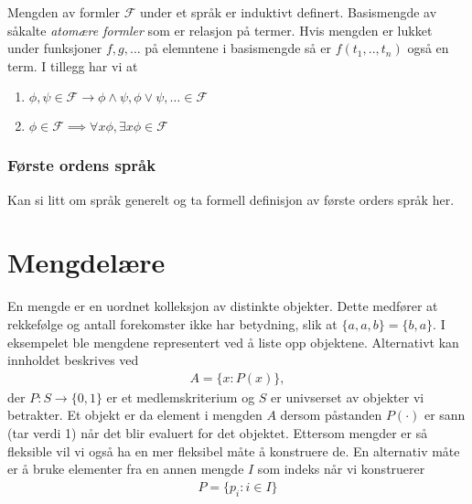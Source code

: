 Mengden av formler $\mathcal{F}$ under et språk er induktivt definert. Basismengde av såkalte \textit{atomære formler} som er relasjon på termer. Hvis mengden er lukket under funksjoner $f, g, \dots$ på elemntene i basismengde så er $f(t_1,..,t_n)$ også en term. I tillegg har vi at 
\begin{enumerate}
\item $\phi, \psi \in \mathcal{F} \rightarrow \phi \land \psi, \phi \lor \psi, \dots \in \mathcal{F}$
\item $\phi \in \mathcal{F} \implies \forall x \phi, \exists x \phi \in \mathcal{F}$
\end{enumerate}
\subsubsection{Første ordens språk}
Kan si litt om språk generelt og ta formell definisjon av første orders språk her.
\section{Mengdelære}
En mengde er en uordnet kolleksjon av distinkte objekter. Dette medfører at rekkefølge og antall forekomster ikke har betydning, slik at $\{a,a,b\}=\{b,a\}$. I eksempelet ble mengdene representert ved å liste opp objektene. Alternativt kan innholdet beskrives ved
\begin{align}
A = \{x:P(x)\},
\end{align}
der $P:S\to \{0,1\}$ er et medlemskriterium og $S$ er univserset av objekter vi betrakter. Et objekt er da element i mengden $A$ dersom påstanden $P(\cdot)$ er sann (tar verdi 1) når det blir evaluert for det objektet. Ettersom mengder er så fleksible vil vi også ha en mer fleksibel måte å konstruere de. En alternativ måte er å bruke elementer fra en annen mengde $I$ som indeks når vi konstruerer
\begin{align}
P = \{p_i : i \in I\}
\end{align}
